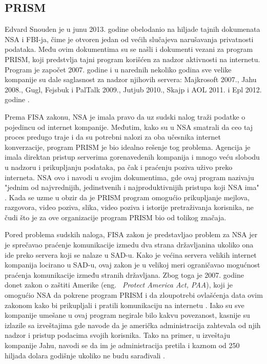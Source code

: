 \documentclass[a4paper]{article}
\begin{document}
\subsection{PRISM}
\label{subsec:prism}
Edvard Snouden je u junu 2013. godine obelodanio na hiljade tajnih dokumenata NSA i FBI-ja, čime je otvoren jedan od većih slučajeva narušavanja privatnosti podataka. Među ovim dokumentima su se našli i dokumenti vezani za program PRISM, koji predstvlja tajni program korišćen za nadzor aktivnosti na internetu. Program je započet 2007. godine i u narednih nekoliko godina sve velike kompanije su dale saglasnost za nadzor njihovih servera: Majkrosoft 2007., Jahu 2008., Gugl, Fejsbuk i PalTalk 2009., Jutjub 2010., Skajp i AOL 2011. i Epl 2012. godine \cite{prism}. 
\par Prema FISA zakonu, NSA je imala pravo da uz sudski nalog traži podatke o pojedincu od internet kompanije. Međutim, kako su u NSA smatrali da ceo taj proces predugo traje i da su potrebni nalozi za oba učesnika internet konverzacije, program PRISM je bio idealno rešenje tog problema. Agencija je imala direktan pristup serverima gorenavedenih kompanija i mnogo veću slobodu u nadzoru i prikupljanju podataka, pa čak i praćenju poziva uživo preko interneta. NSA ovo i navodi u svojim dokumentima, gde ovaj program nazivaju "jednim od najvrednijih, jedinstvenih i najproduktivnijih pristupa koji NSA ima" \cite{prism}. Kada se uzme u obzir da je PRISM program omogućio prikupljanje mejlova, razgovora, video poziva, slika, video poziva i istorije pretraživanja korisnika, ne čudi što je za ove organizacije program PRISM bio od tolikog značaja.
\par Pored problema sudskih naloga, FISA zakon je predstavljao problem za NSA jer je sprečavao praćenje komunikacije izmedu dva strana državljanina ukoliko ona ide preko servera koji se nalaze u SAD-u. Kako je većina servera velikih internet kompanija locirano u SAD-u, ovaj zakon je u velikoj meri ograničavao mogućnost praćenja komunikacije između stranih državljana. Zbog toga je 2007. godine donet zakon o zaštiti Amerike (eng. ~{\em Protect America Act, PAA}), koji je omogućio NSA da pokrene program PRISM i da zloupotrebi ovlašćenja data ovim zakonom kako bi prikupljali i pratili komunikaciju na internetu \cite{prism1}. Iako su sve kompanije umešane u ovaj program negirale bilo kakvu povezanost, kasnije su izlazile sa izveštajima gde navode da je američka administracija zahtevala od njih nadzor i pristup podacima svojih korisnika. Tako na primer, u izveštaju kompanije Jahu, navodi se da im je administracija pretila i kaznom od 250 hiljada dolara godišnje ukoliko ne budu sarađivali \cite{prism2}. 
\end{document}
